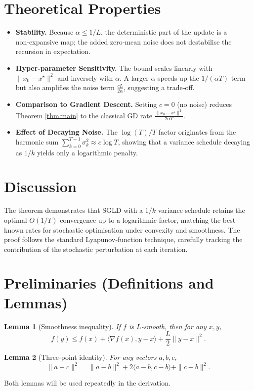 \documentclass{article}
\newtheorem{lemma}{Lemma}
\begin{document}
\section*{Theoretical Properties}
\begin{itemize}
\item \textbf{Stability.}  Because $\alpha\le 1/L$, the deterministic part of the update is a non‑expansive map; the added zero‑mean noise does not destabilise the recursion in expectation.
\item \textbf{Hyper‑parameter Sensitivity.}  The bound scales linearly with $\|x_0-x^\star\|^2$ and inversely with $\alpha$.  A larger $\alpha$ speeds up the $1/(\alpha T)$ term but also amplifies the noise term $\frac{cL}{2\alpha}$, suggesting a trade‑off.
\item \textbf{Comparison to Gradient Descent.}  Setting $c=0$ (no noise) reduces Theorem \ref{thm:main} to the classical GD rate $\frac{\|x_0-x^\star\|^2}{2\alpha T}$.
\item \textbf{Effect of Decaying Noise.}  The $\log(T)/T$ factor originates from the harmonic sum $\sum_{k=0}^{T-1}\sigma_k^2\approx c\log T$, showing that a variance schedule decaying as $1/k$ yields only a logarithmic penalty.
\end{itemize}

\section*{Discussion}
The theorem demonstrates that SGLD with a $1/k$ variance schedule retains the optimal $O(1/T)$ convergence up to a logarithmic factor, matching the best known rates for stochastic optimisation under convexity and smoothness.  The proof follows the standard Lyapunov‑function technique, carefully tracking the contribution of the stochastic perturbation at each iteration.

\newpage

\section*{Preliminaries (Definitions and Lemmas)}
\begin{lemma}[Smoothness inequality]\label{lem:smooth}
If $f$ is $L$‑smooth, then for any $x,y$,
\[
f(y)\le f(x)+\langle\nabla f(x),y-x\rangle+\frac{L}{2}\|y-x\|^2.
\]
\end{lemma}
\begin{lemma}[Three‑point identity]\label{lem:three}
For any vectors $a,b,c$,
\[
\|a-c\|^2=\|a-b\|^2+2\langle a-b,c-b\rangle+\|c-b\|^2.
\]
\end{lemma}
Both lemmas will be used repeatedly in the derivation.
\end{document}
